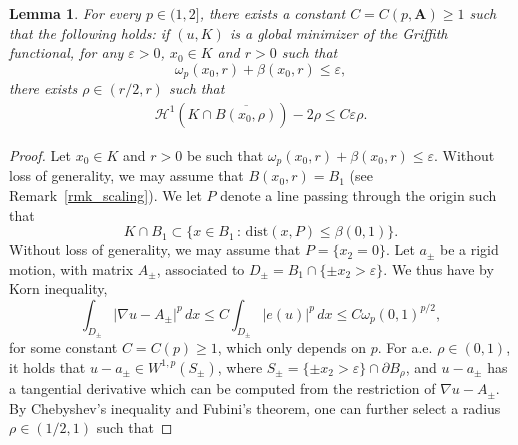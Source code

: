 \documentclass[12pt]{article}
\newtheorem{lemma}[theorem]{Lemma}
\theoremstyle{definition}
\theoremstyle{remark}
\numberwithin{equation}{section}
\newcommand{\dd}{\partial}
\newcommand{\abs}[1]{\lvert #1 \rvert}
\newcommand{\D}{\nabla}
\newcommand{\A}{\mathbf{A}}
\renewcommand{\H}{\mathcal{H}}
\begin{document}
\begin{lemma}
    \label{LemmaDensity}
    For every $p\in(1,2]$, there exists a constant $C=C(p,\A) \geq 1$ such that the following holds: if $(u,K)$ is a
    global minimizer of the Griffith functional, for any $\varepsilon>0$, $x_0\in K$ and $r>0$ such that
    \begin{equation}
        \omega_p(x_0,r)+\beta(x_0,r) \leq \varepsilon,
    \end{equation}
    there exists $\rho \in (r/2,r)$ such that
    \begin{align*}
        \H^1(K\cap \overline{B(x_0,\rho)})-2\rho\leq C\varepsilon \rho. 
    \end{align*}
\end{lemma}

\begin{proof}
    Let $x_0 \in K$ and $r > 0$ be such that $\omega_p(x_0,r)+\beta(x_0,r)\leq\varepsilon$. Without loss of generality,
    we may assume that $B(x_0,r) = B_1$ (see Remark~\ref{rmk_scaling}).  We let $P$ denote a line passing through
    the origin such that
    \begin{equation}
        K \cap B_1 \subset \{x \in B_1 \, : \, \mathrm{dist}(x,P) \leq \beta(0,1)\}.
    \end{equation}
    Without loss of generality, we may assume that $P=\{x_2=0\}$.
    Let $a_\pm$ be a rigid motion, with matrix $A_{\pm}$, associated to $D_\pm = B_1 \cap \{\pm x_2>\varepsilon\}$.
    We thus have by Korn inequality,
    \begin{equation}\label{eq_r1}
        \int_{D_{\pm}} \abs{\D u - A_\pm}^p \, dx \leq C \int_{D_{\pm}} \abs{e(u)}^p \, dx \leq C \omega_p(0,1)^{p/2},
    \end{equation}
    for some constant $C = C(p) \geq 1$, which only depends on $p$.
    For a.e. $\rho \in (0,1)$, it holds that $u-a_\pm\in W^{1,p}(S_\pm)$, where $S_{\pm}=\{\pm
    x_2>\varepsilon\}\cap\dd B_\rho$, and $u - a_\pm$ has a tangential derivative which can be computed from
    the restriction of $\D u-A_\pm$. By Chebyshev's inequality and Fubini's theorem, one can further select a
    radius $\rho \in (1/2,1)$ such that

\end{proof}
\end{document}
